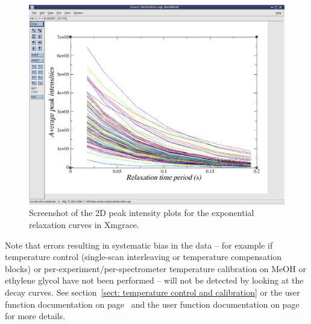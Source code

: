 \begin{figure}
\centerline{\includegraphics[width=\textwidth, bb=14 14 923 724]{graphics/screenshots/xmgrace_peak_intensities}}
\caption[Peak intensity 2D plot xmgrace screenshot]{Screenshot of the 2D peak intensity plots for the exponential relaxation curves in Xmgrace.}\label{fig: screenshot: xmgrace peak intensities}
\end{figure}

Note that errors resulting in systematic bias in the data -- for example if temperature control (single-scan interleaving or temperature compensation blocks) or per-experiment/per-spectrometer temperature calibration on MeOH or ethylene glycol have not been performed -- will not be detected by looking at the decay curves.  See section~\ref{sect: temperature control and calibration} or the  user function documentation on page~\pageref{uf: relax_data.temp_calibration} and the  user function documentation on page~\pageref{uf: relax_data.temp_control} for more details.
